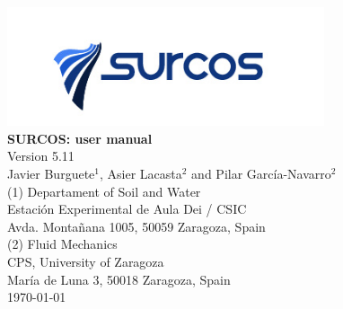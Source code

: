 \documentclass[11pt, twoside, openany, a4paper]{book}
\begin{document}

\nocite{*}




\pagestyle{empty}

\begin{titlepage} 
\begin{center} 
 
\includegraphics*[height=3.5cm]{images/logo_surcos.png}\\ 

\vspace*{3.5cm} 
{\Huge \textbf{SURCOS: user manual\\}}
\vspace*{1cm} 
{\normalsize Version 5.11}\\
\vspace*{1cm} 
{\Large Javier Burguete$^1$, Asier Lacasta$^2$ and Pilar García-Navarro$^2$}\\ 
\vspace*{2.5cm} 
{\normalsize (1) Departament of Soil and Water}\\
{Estación Experimental de Aula Dei / CSIC}\\ 
{Avda. Montañana 1005, 50059 Zaragoza, Spain}\\ 
\vspace*{1cm} 
{\normalsize (2) Fluid Mechanics}\\ 
{CPS, University of Zaragoza}\\ 
{María de Luna 3, 50018 Zaragoza, Spain}\\
\vspace*{1cm} 
{\normalsize \today}\\ 
\end{center} 
\end{titlepage} 
\cleardoublepage

\pagestyle{plain}

\tableofcontents
\listoffigures

\cleardoublepage

\pagestyle{headings}


\cleardoublepage


\cleardoublepage



%
\end{document}
